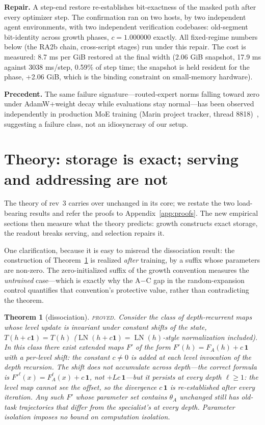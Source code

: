 \documentclass[11pt]{article}
\newtheorem{theorem}{Theorem}
\theoremstyle{definition}\newtheorem{definition}{Definition}
\theoremstyle{remark}\newtheorem{remark}{Remark}
\begin{document}
\textbf{Repair.} A step-end restore re-establishes bit-exactness of the masked path after
every optimizer step. The confirmation ran on two hosts, by two independent agent
environments, with two independent verification codebases: old-segment bit-identity
across growth phases, $c=1.000000$ exactly. All fixed-regime
numbers below (the RA2b chain, cross-script stages) run under this repair. The cost is measured: 8.7 ms per GiB restored at the final width (2.06 GiB snapshot, 17.9 ms against 3038 ms/step, 0.59\% of step time; the snapshot is held resident for the phase, +2.06 GiB, which is the binding constraint on small-memory hardware).

\textbf{Precedent.} The same failure signature---routed-expert norms falling toward zero
under AdamW+weight decay while evaluations stay normal---has been observed independently in
production MoE training (Marin project tracker, thread 8818)~\cite{marin}, suggesting a failure class,
not an idiosyncrasy of our setup.

\section{Theory: storage is exact; serving and addressing are not}
\label{sec:theory}

The theory of rev~3 carries over unchanged in its core; we restate the two load-bearing
results and refer the proofs to Appendix~\ref{app:proofs}. The new empirical sections then
measure what the theory predicts: growth constructs exact storage, the readout breaks
serving, and selection repairs it.

One clarification, because it is easy to misread the dissociation result: the construction
of Theorem~\ref{thm:dissoc} is realized \emph{after} training, by a suffix whose parameters
are non-zero. The zero-initialized suffix of the growth convention measures the
\emph{untrained} case---which is exactly why the A$-$C gap in the random-expansion control
quantifies that convention's protective value, rather than contradicting the theorem.

\begin{theorem}[dissociation]\label{thm:dissoc}
\textsc{proved.} Consider the class of depth-recurrent maps whose level update is
invariant under constant shifts of the state, $T(h+c\mathbf{1})=T(h)$
($\operatorname{LN}(h+c\mathbf{1})=\operatorname{LN}(h)$-style normalization included).
In this class there exist extended maps $F'$ of the form $F'(h)=F_A(h)+c\,\mathbf{1}$
with a \emph{per-level} shift: the constant $c\neq0$ is added at each level invocation of the
depth recursion. The shift does not
accumulate across depth---the correct formula is $F'^{\ell}(x)=F_A^{\ell}(x)+c\,\mathbf{1}$,
not $+Lc\,\mathbf{1}$---but it persists at every depth $\ell\ge1$: the level map cannot see
the offset, so the divergence $c\,\mathbf{1}$ is re-established after every iteration. Any
such $F'$ whose parameter set contains $\theta_A$ unchanged still has old-task trajectories
that differ from the specialist's at every depth. Parameter isolation imposes no bound on
computation isolation.
\end{theorem}
\end{document}
